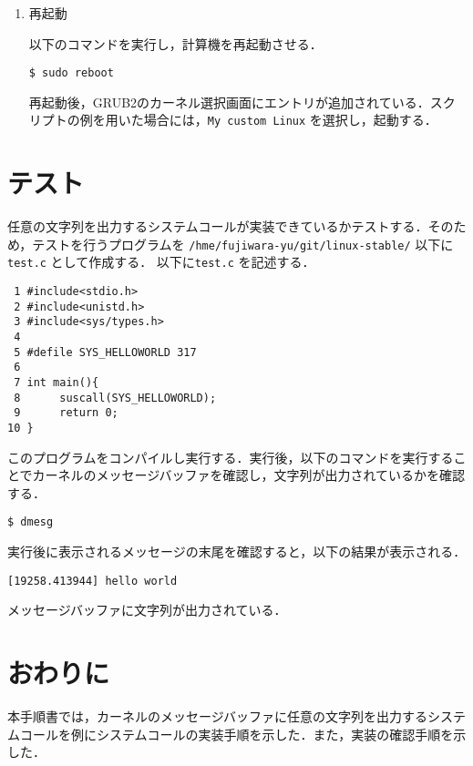\documentclass[12pt]{jsarticle}
\begin{document}
\begin{enumerate}
\begin{enumerate}
\end{enumerate}

\item 再起動

以下のコマンドを実行し，計算機を再起動させる．
\begin{verbatim}
$ sudo reboot
\end{verbatim}
再起動後，GRUB2のカーネル選択画面にエントリが追加されている．スクリプトの例を用いた場合には，\verb|My custom Linux| を選択し，起動する．


\end{enumerate}




\section{テスト}\label{sec:test}

任意の文字列を出力するシステムコールが実装できているかテストする．そのため，テストを行うプログラムを \verb|/hme/fujiwara-yu/git/linux-stable/| 以下に\verb|test.c| として作成する．
以下に\verb|test.c| を記述する．
\begin{verbatim}
 1 #include<stdio.h>
 2 #include<unistd.h>
 3 #include<sys/types.h>
 4
 5 #defile SYS_HELLOWORLD 317
 6
 7 int main(){
 8      suscall(SYS_HELLOWORLD);
 9      return 0;
10 }
\end{verbatim}
このプログラムをコンパイルし実行する．実行後，以下のコマンドを実行することでカーネルのメッセージバッファを確認し，文字列が出力されているかを確認する．
\begin{verbatim}
$ dmesg
\end{verbatim}
実行後に表示されるメッセージの末尾を確認すると，以下の結果が表示される．
\begin{verbatim}
[19258.413944] hello world
\end{verbatim}
メッセージバッファに文字列が出力されている．


\section{おわりに}\label{sec:conclusion}
本手順書では，カーネルのメッセージバッファに任意の文字列を出力するシステムコールを例にシステムコールの実装手順を示した．また，実装の確認手順を示した．
\end{document}
